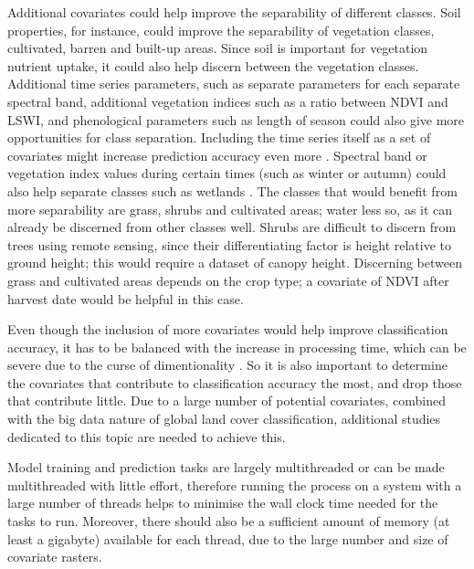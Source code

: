 \documentclass[a4paper,12pt]{scrbook}
\begin{document}
Additional covariates could help improve the separability of different classes. Soil properties, for instance, could improve the separability of vegetation classes, cultivated, barren and built-up areas. Since soil is important for vegetation nutrient uptake, it could also help discern between the vegetation classes. Additional time series parameters, such as separate parameters for each separate spectral band, additional vegetation indices such as a ratio between NDVI and LSWI, and phenological parameters such as length of season could also give more opportunities for class separation. Including the time series itself as a set of covariates might increase prediction accuracy even more \citep{Pelletier2016hardrf}. Spectral band or vegetation index values during certain times (such as winter or autumn) could also help separate classes such as wetlands \citep{davranche2010wetland}. The classes that would benefit from more separability are grass, shrubs and cultivated areas; water less so, as it can already be discerned from other classes well. Shrubs are difficult to discern from trees using remote sensing, since their differentiating factor is height relative to ground height; this would require a dataset of canopy height. Discerning between grass and cultivated areas depends on the crop type; a covariate of NDVI after harvest date would be helpful in this case.

Even though the inclusion of more covariates would help improve classification accuracy, it has to be balanced with the increase in processing time, which can be severe due to the curse of dimentionality \citep{Pelletier2016hardrf}. So it is also important to determine the covariates that contribute to classification accuracy the most, and drop those that contribute little. Due to a large number of potential covariates, combined with the big data nature of global land cover classification, additional studies dedicated to this topic are needed to achieve this.

Model training and prediction tasks are largely multithreaded or can be made multithreaded with little effort, therefore running the process on a system with a large number of threads helps to minimise the wall clock time needed for the tasks to run. Moreover, there should also be a sufficient amount of memory (at least a gigabyte) available for each thread, due to the large number and size of covariate rasters.
\end{document}
